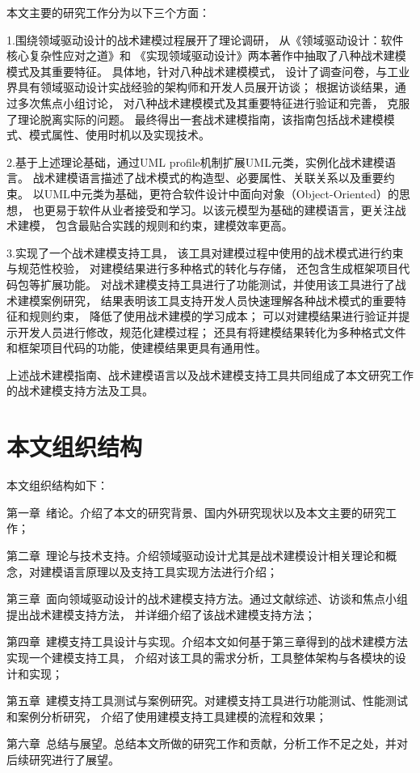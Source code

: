 本文主要的研究工作分为以下三个方面：

1.围绕领域驱动设计的战术建模过程展开了理论调研，
从《领域驱动设计：软件核心复杂性应对之道》\cite{DBLP:books/daglib/0013521}和
《实现领域驱动设计》\cite{vernon2013implementing}两本著作中抽取了八种战术建模模式及其重要特征。
具体地，针对八种战术建模模式，
设计了调查问卷，与工业界具有领域驱动设计实战经验的架构师和开发人员展开访谈；
根据访谈结果，通过多次焦点小组讨论，
对八种战术建模模式及其重要特征进行验证和完善，
克服了理论脱离实际的问题。
最终得出一套战术建模指南，该指南包括战术建模模式、模式属性、使用时机以及实现技术。


2.基于上述理论基础，通过UML profile机制扩展UML元类，实例化战术建模语言。
战术建模语言描述了战术模式的构造型、必要属性、关联关系以及重要约束。
以UML中元类为基础，更符合软件设计中面向对象（Object-Oriented）的思想，
也更易于软件从业者接受和学习。以该元模型为基础的建模语言，更关注战术建模，
包含最贴合实践的规则和约束，建模效率更高。

3.实现了一个战术建模支持工具，
该工具对建模过程中使用的战术模式进行约束与规范性校验，
对建模结果进行多种格式的转化与存储，
还包含生成框架项目代码包等扩展功能。
对战术建模支持工具进行了功能测试，并使用该工具进行了战术建模案例研究，
结果表明该工具支持开发人员快速理解各种战术模式的重要特征和规则约束，
降低了使用战术建模的学习成本；
可以对建模结果进行验证并提示开发人员进行修改，规范化建模过程；
还具有将建模结果转化为多种格式文件和框架项目代码的功能，使建模结果更具有通用性。


上述战术建模指南、战术建模语言以及战术建模支持工具共同组成了本文研究工作的战术建模支持方法及工具。

\section{本文组织结构}

本文组织结构如下：

第一章~绪论。介绍了本文的研究背景、国内外研究现状以及本文主要的研究工作；

第二章~理论与技术支持。介绍领域驱动设计尤其是战术建模设计相关理论和概念，对建模语言原理以及支持工具实现方法进行介绍；

第三章~面向领域驱动设计的战术建模支持方法。通过文献综述、访谈和焦点小组提出战术建模支持方法，
并详细介绍了该战术建模支持方法；

第四章~建模支持工具设计与实现。介绍本文如何基于第三章得到的战术建模方法实现一个建模支持工具，
介绍对该工具的需求分析，工具整体架构与各模块的设计和实现；

第五章~建模支持工具测试与案例研究。对建模支持工具进行功能测试、性能测试和案例分析研究，
介绍了使用建模支持工具建模的流程和效果；

第六章~总结与展望。总结本文所做的研究工作和贡献，分析工作不足之处，并对后续研究进行了展望。
